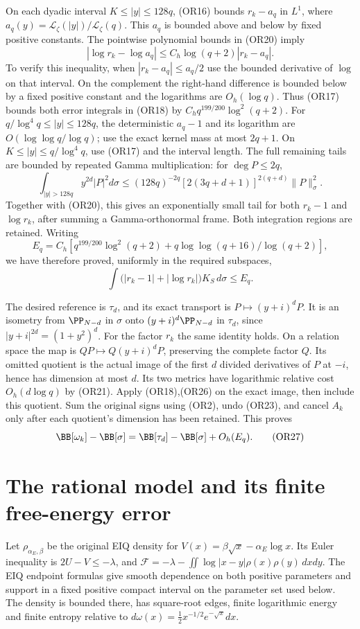 \documentclass[11pt,a4paper]{article}
\begin{document}
On each dyadic interval \(K\leq |y|\leq128q\), (OR16) bounds
\(r_k-a_q\) in \(L^1\), where
\(a_q(y)=\mathcal L_\zeta(|y|)/\mathcal L_\zeta(q)\).
This \(a_q\) is bounded above and below by fixed positive constants.
The pointwise polynomial bounds in (OR20) imply
\[
 |\log r_k-\log a_q|\leq C_h\log(q+2)|r_k-a_q|.
 \tag{OR24}
\]
To verify this inequality, when \(|r_k-a_q|\leq a_q/2\) use the
bounded derivative of \(\log\) on that interval.  On the complement
the right-hand difference is bounded below by a fixed positive
constant and the logarithms are \(O_h(\log q)\).
Thus (OR17) bounds both error integrals in (OR18) by
\(C_hq^{199/200}\log^2(q+2)\).
For \(q/\log^4q\leq|y|\leq128q\), the deterministic \(a_q-1\)
and its logarithm are \(O(\log\log q/\log q)\); use the exact
kernel mass at most \(2q+1\).  On
\(K\leq|y|\leq q/\log^4q\), use (OR17) and the interval length.
The full remaining tails are bounded by repeated Gamma
multiplication: for \(\deg P\leq2q\),
\[
 \int_{|y|>128q} y^{2d}|P|^2d\sigma
 \leq (128q)^{-2q}[2(3q+d+1)]^{2(q+d)}\|P\|_\sigma^2 .
 \tag{OR25}
\]
Together with (OR20), this gives an exponentially small tail for
both \(r_k-1\) and \(\log r_k\), after summing a Gamma-orthonormal
frame.  Both integration regions are retained.
Writing
\[
 E_q=C_h\left[q^{199/200}\log^2(q+2)
       +q\log\log(q+16)/\log(q+2)\right],
\]
we have therefore proved, uniformly in the required subspaces,
\[
 \int\bigl(|r_k-1|+|\log r_k|\bigr)K_S\,d\sigma\leq E_q.
 \tag{OR26}
\]

The desired reference is \(\tau_d\), and its exact transport is
\(P\mapsto(y+i)^dP\).  It is an isometry from
\(\PP_{N-d}\) in \(\sigma\) onto
\((y+i)^d\PP_{N-d}\) in \(\tau_d\), since
\(|y+i|^{2d}=(1+y^2)^d\).
For the factor \(r_k\) the same identity holds.  On a relation
space the map is \(QP\mapsto Q(y+i)^dP\), preserving the complete
factor \(Q\).  Its omitted quotient is the actual image of
the first \(d\) divided derivatives of \(P\) at \(-i\), hence has
dimension at most \(d\).  Its two metrics have logarithmic
relative cost \(O_h(d\log q)\) by (OR21).
Apply (OR18),(OR26) on the exact image, then include this quotient.
Sum the original signs using (OR2), undo (OR23), and cancel \(A_k\)
only after each quotient's dimension has been retained.  This proves
\[
 \BB[\omega_k]-\BB[\sigma]
 =\BB[\tau_d]-\BB[\sigma]+O_h(E_q).                  \tag{OR27}
\]

\section{The rational model and its finite free-energy error}
Let \(\rho_{\alpha_E,\beta}\) be the original EIQ density for
\(V(x)=\beta\sqrt x-\alpha_E\log x\).  Its Euler inequality is
\(2U-V\leq-\lambda\), and
\(\mathcal F=-\lambda-\iint\log|x-y|\rho(x)\rho(y)\,dxdy\).
The EIQ endpoint formulas give smooth dependence on both positive
parameters and support in a fixed positive compact interval on
the parameter set used below.  The density is bounded there,
has square-root edges, finite logarithmic energy and finite
entropy relative to
\(d\omega(x)=\tfrac12x^{-1/2}e^{-\sqrt x}dx\).
\end{document}
